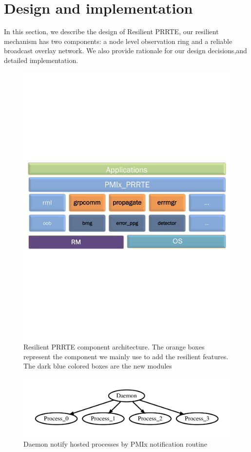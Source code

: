 \documentclass[sigconf]{acmart}
\begin{document}
\section{Design and implementation}

In this section, we describe the design of Resilient PRRTE, our resilient mechanism has two components: a node level observation ring and a reliable broadcast overlay network. We also provide rationale for our design decisions,and detailed implementation.

\begin{figure}[h]
  \centering
  \includegraphics[trim=0.2cm 9.0cm 0.2cm 9cm,width=\linewidth]{PMIx_PRRTE.pdf}
  \caption{Resilient PRRTE component architecture. The orange boxes represent the component we mainly use to add the resilient features. The dark blue colored boxes are the new modules}
\end{figure}

\begin{figure}[h]
  \centering
  \includegraphics[width=\linewidth]{server_client.pdf}
  \caption{Daemon notify hosted processes by PMIx notification routine }
\end{figure}
\end{document}
